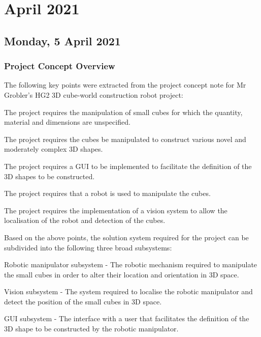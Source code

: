 \chapter[2021 April]{April 2021}

\section[2021/04/05]{Monday, 5 April 2021}

\subsection{Project Concept Overview}

The following key points were extracted from the project concept note for Mr Grobler's HG2 3D cube-world construction robot project:

\begin{compactitem}
    \item The project requires the manipulation of small cubes for which the quantity, material and dimensions are unspecified.
    \item The project requires the cubes be manipulated to construct various novel and moderately complex 3D shapes.
    \item The project requires a \ac{GUI} to be implemented to facilitate the definition of the 3D shapes to be constructed.
    \item The project requires that a robot is used to manipulate the cubes.
    \item The project requires the implementation of a vision system to allow the localisation of the robot and detection of the cubes.
\end{compactitem}

Based on the above points, the solution system required for the project can be subdivided into the following three broad subsystems:

\begin{compactitem}
    \item Robotic manipulator subsystem - The robotic mechanism required to manipulate the small cubes in order to alter their location and orientation in 3D space.
    \item Vision subsystem - The system required to localise the robotic manipulator and detect the position of the small cubes in 3D space.
    \item \ac{GUI} subsystem - The interface with a user that facilitates the definition of the 3D shape to be constructed by the robotic manipulator.
\end{compactitem}

